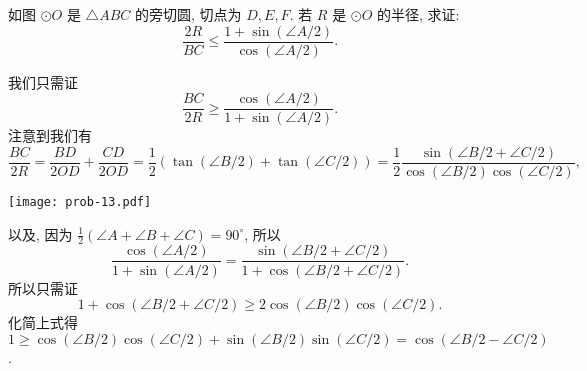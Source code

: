 \begin{prob}
\label{prob:prob-13}
如图 $\odot O$ 是 $\triangle ABC$ 的旁切圆, 切点为 $D, E, F$.
若 $R$ 是 $\odot O$ 的半径, 求证:
\[
\frac{2R}{BC} \le \frac{1 + \sin(\angle A/2)}{\cos(\angle A/2)}.
\]
\end{prob}

\begin{soln}
我们只需证
\[
\frac{BC}{2R}\ge \frac{\cos(\angle A/2)}{1+\sin(\angle A/2)}.
\]
注意到我们有
\[
\frac{BC}{2R} = \frac{BD}{2OD} + \frac{CD}{2OD} =
\frac{1}{2}(\tan(\angle B/2) + \tan(\angle C/2)) =
\frac{1}{2}\frac{\sin(\angle B/2 + \angle C/2)}{\cos(\angle B/2)\cos(\angle C/2)},
\]
\begin{center}
\texttt{[image: prob-13.pdf]}
\end{center}
以及, 因为 $\frac{1}{2}(\angle A + \angle B + \angle C) = 90^\circ$, 所以
\[
\frac{\cos(\angle A/2)}{1 + \sin(\angle A/2)} =
\frac{\sin(\angle B/2 + \angle C/2)}{1 + \cos(\angle B/2 + \angle C/2)}.
\]
所以只需证
\[
1 + \cos(\angle B/2 + \angle C/2) \ge 2\cos(\angle B/2)\cos(\angle C/2).
\]
化简上式得 $1 \ge \cos(\angle B/2)\cos(\angle C/2) +
\sin(\angle B/2)\sin(\angle C/2) = \cos(\angle B/2 - \angle C/2)$.
\end{soln}
